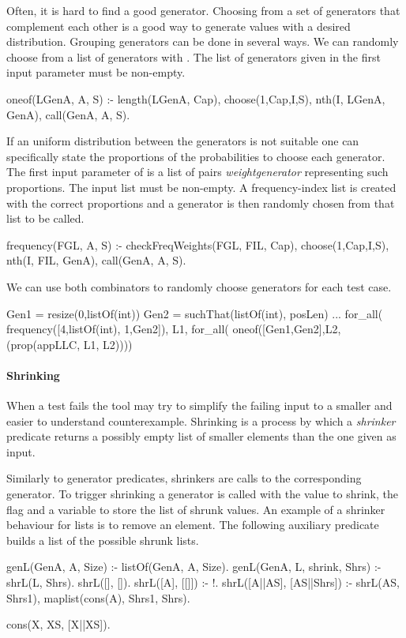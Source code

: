 Often, it is hard to find a good generator.
%
Choosing from a set of generators that complement each other
is a good way to generate values with a desired distribution.
%
Grouping generators can be done in several ways.
%
We can randomly choose from a list of generators with .
%
The list of generators given in the first input parameter must be non-empty.
%
\begin{yapcode}
 oneof(LGenA, A, S) :- length(LGenA, Cap), choose(1,Cap,I,S),
   nth(I, LGenA, GenA), call(GenA, A, S).
\end{yapcode}
%
If an uniform distribution between the generators is not suitable one can
specifically state the proportions of the probabilities to choose each
generator.
%
The first input parameter of  is a list of pairs
\yap{\{}\emph{weight}\yap{,}\emph{generator}\yap{\}} representing such
proportions.
%
The input list must be non-empty.
%
A frequency-index list is created with the correct proportions and a
generator is then randomly chosen from that list to be called.
%
\begin{yapcode}
 frequency(FGL, A, S) :- checkFreqWeights(FGL, FIL, Cap),
   choose(1,Cap,I,S), nth(I, FIL, GenA), call(GenA, A, S).
\end{yapcode}
%
We can use both combinators to randomly choose generators for each test case.
%
\begin{yapcode}
 Gen1 = resize(0,listOf(int))
 Gen2 = suchThat(listOf(int), posLen)
 ...
   for_all( frequency([{4,listOf(int)}, {1,Gen2}]),  L1,
     for_all( oneof([Gen1,Gen2],L2, (prop({appLLC, L1, L2}))))
\end{yapcode}






\paragraph{\bf Shrinking}

When a test fails the tool may try to simplify the failing input to a
smaller and easier to understand counterexample.
%
Shrinking is a process by which a \emph{shrinker} predicate returns a
possibly empty list of smaller elements than the one given as input.


Similarly to generator predicates, shrinkers are calls to the
corresponding generator.
%
To trigger shrinking a generator is called with the value to shrink, the
flag  and a variable to store the list of shrunk values.
%
An example of a shrinker behaviour for lists is to remove an
element.
%
The following auxiliary predicate builds a list of the possible shrunk
lists.
%
\begin{yapcode}
 genL(GenA, A, Size) :- listOf(GenA, A, Size).
 genL(GenA, L, shrink, Shrs) :-  shrL(L, Shrs).
 shrL([], []).
 shrL([A], [[]]) :- !.
 shrL([A||AS], [AS||Shrs]) :-
   shrL(AS, Shrs1), maplist(cons(A), Shrs1, Shrs).

 cons(X, XS, [X||XS]).
\end{yapcode}


